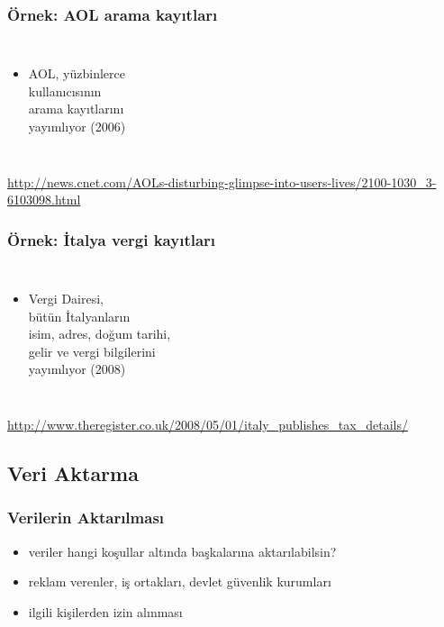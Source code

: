 \documentclass[dvipsnames]{beamer}
\theoremstyle{plain}
\begin{document}
\begin{frame}
  \frametitle{Örnek: AOL arama kayıtları}

  \begin{columns}

    \begin{itemize}
      \item AOL, yüzbinlerce\\
        kullanıcısının\\
        arama kayıtlarını\\
        yayımlıyor (2006)
    \end{itemize}
  \end{columns}

  \medskip
  \tiny{\url{http://news.cnet.com/AOLs-disturbing-glimpse-into-users-lives/2100-1030_3-6103098.html}}\\
\end{frame}

\begin{frame}
  \frametitle{Örnek: İtalya vergi kayıtları}

  \begin{columns}

    \begin{itemize}
      \item Vergi Dairesi,\\
        bütün İtalyanların\\
        isim, adres, doğum tarihi,\\
        gelir ve vergi bilgilerini\\
        yayımlıyor (2008)
    \end{itemize}
  \end{columns}

  \medskip
  \tiny{\url{http://www.theregister.co.uk/2008/05/01/italy_publishes_tax_details/}}\\
\end{frame}

\subsection{Veri Aktarma}

\begin{frame}
  \frametitle{Verilerin Aktarılması}

  \begin{itemize}
    \item veriler hangi koşullar altında başkalarına aktarılabilsin?
    \item reklam verenler, iş ortakları, devlet güvenlik kurumları
    \item ilgili kişilerden izin alınması
  \end{itemize}
\end{frame}
\end{document}
